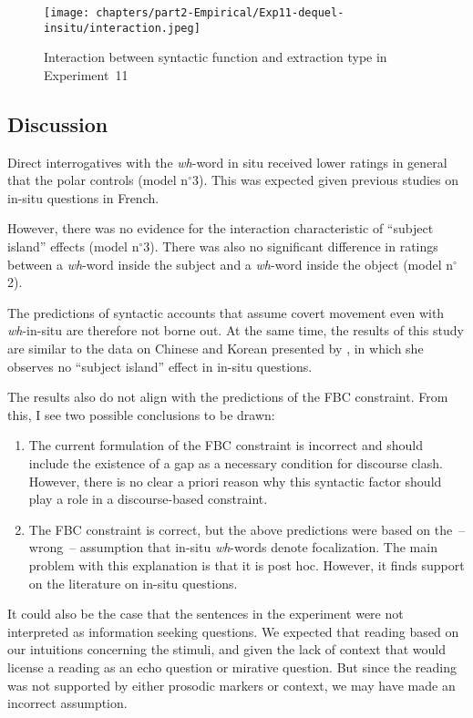 

\begin{figure}
    \centering
    \texttt{[image: chapters/part2-Empirical/Exp11-dequel-insitu/interaction.jpeg]}
    \caption{Interaction between syntactic function and extraction type in Experiment~11}
    \label{fig:exp11-interaction}
\end{figure}

\subsection{Discussion}

Direct interrogatives with the \emph{wh}-word in situ received lower ratings in general that the polar controls (model n$^{\circ}$3). This was expected given previous studies on in-situ questions in French.

However, there was no evidence for the interaction characteristic of ``subject island'' effects (model n$^{\circ}$3). There was also no significant difference in ratings between a \emph{wh}-word inside the subject and a \emph{wh}-word inside the object (model n$^{\circ}$2). 

The predictions of syntactic accounts that assume covert movement even with \textit{wh}-in-situ are therefore not borne out. At the same time, the results of this study are similar to the data on Chinese and Korean presented by \citet{Reinhart.1997}, in which she observes no ``subject island'' effect in in-situ questions. 

The results also do not align with the predictions of the FBC constraint. From this, I see two possible conclusions to be drawn:
\begin{enumerate}
    \item The current formulation of the FBC constraint is incorrect and should include the existence of a gap  as a necessary condition for discourse clash. However, there is no clear a priori reason why this syntactic factor should play a role in a discourse-based constraint.
    \item The FBC constraint is correct, but the above predictions were based on the~-- wrong~-- assumption that in-situ \emph{wh}-words denote focalization. The main problem with this explanation is that it is post hoc. However, it finds support on the literature on in-situ questions.
\end{enumerate}

It could also be the case that the sentences in the experiment were not interpreted as information seeking questions. We expected that reading based on our intuitions concerning the stimuli, and given the lack of context that would license a reading as an echo question or mirative question. But since the reading was not supported by either prosodic markers or context, we may have made an incorrect assumption.

